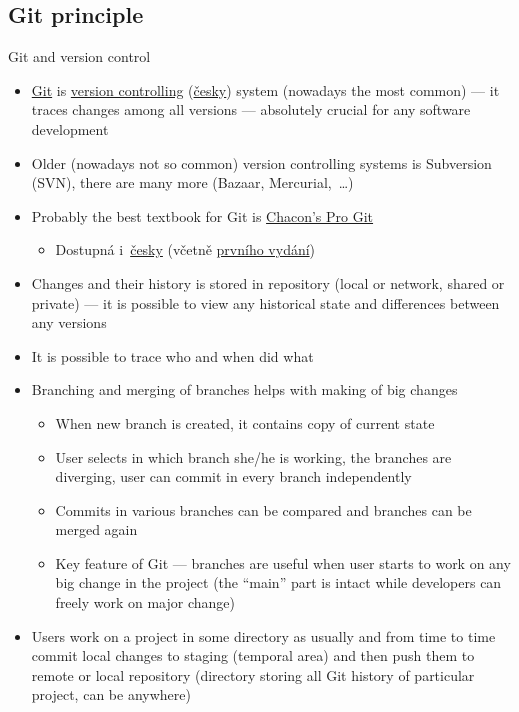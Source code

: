 \documentclass[compress, ucs, xelatex, 11pt, xcolor=svgnames, aspectratio=169,
	hyperref={
		bookmarks=true,
		unicode=true,
		colorlinks=true,
		pdftitle={Linux, command line and MetaCentrum},
		plainpages=false,
		pdfauthor={Vojtech Zeisek},
		pdfsubject={Course about use of Linux command line, writing shell scripts and using MetaCentrum of CESNET},
		pdfcreator={XeLaTeX},
		pdfkeywords={Linux, GNU, BASH, shell, command line, MetaCentrum},
		linkcolor=DarkRed, %
		anchorcolor=DarkBlue, %
		citecolor=Indigo, %
		filecolor=NavyBlue, %
		menucolor=DarkMagenta, %
		urlcolor=DarkBlue, %
		pdftex},
	url={hyphens, lowtilde} %
	]{beamer}
\begin{document}
\subsection{Git principle}

\begin{frame}[allowframebreaks]{Git and version control}
	\begin{itemize}
		\item \href{https://git-scm.com/}{Git} is \href{https://en.wikipedia.org/wiki/Version_control}{version controlling} (\href{https://cs.wikipedia.org/wiki/Verzov\%C3\%A1n\%C3\%AD}{česky}) system (nowadays the most common) --- it traces changes among all versions --- absolutely crucial for any software development
		\item Older (nowadays not so common) version controlling systems is Subversion (SVN), there are many more (Bazaar, Mercurial,~\ldots)
		\item Probably the best textbook for Git is \href{https://git-scm.com/book/en/v2}{Chacon's Pro Git}
		\begin{itemize}
			\item Dostupná i~\href{https://git-scm.com/book/cs/v2}{česky} (včetně \href{https://knihy.nic.cz/\#ProGit}{prvního vydání})
		\end{itemize}
		\item Changes and their history is stored in repository (local or network, shared or private) --- it is possible to view any historical state and differences between any versions
		\item It is possible to trace who and when did what
		\item Branching and merging of branches helps with making of big changes
		\begin{itemize}
			\item When new branch is created, it contains copy of current state
			\item User selects in which branch she/he is working, the branches are diverging, user can commit in every branch independently
			\item Commits in various branches can be compared and branches can be merged again
			\item Key feature of Git --- branches are useful when user starts to work on any big change in the project (the \enquote{main} part is intact while developers can freely work on major change)
		\end{itemize}
		\item Users work on a project in some directory as usually and from time to time commit local changes to staging (temporal area) and then push them to remote or local repository (directory storing all Git history of particular project, can be anywhere)

\end{itemize}
\end{frame}
\end{document}
